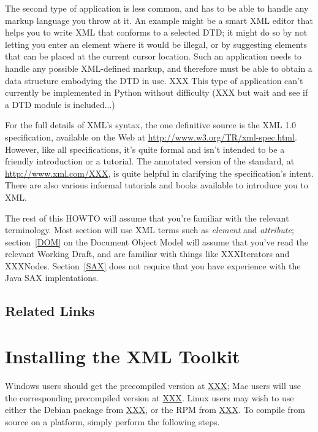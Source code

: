 \documentclass{howto}
\begin{document}
The second type of application is less common, and has to be able to
handle any markup language you throw at it.  An example might be a
smart XML editor that helps you to write XML that conforms to a
selected DTD; it might do so by not letting you enter an element where
it would be illegal, or by suggesting elements that can be placed at
the current cursor location.  Such an application needs to handle any
possible XML-defined markup, and therefore must be able to obtain a
data structure embodying the DTD in use.  XXX This type of application
can't currently be implemented in Python without difficulty (XXX but
wait and see if a DTD module is included...)

For the full details of XML's syntax, the one definitive source is the
XML 1.0 specification, available on the Web at
\url{http://www.w3.org/TR/xml-spec.html}.  However, like all
specifications, it's quite formal and isn't intended to be a friendly
introduction or a tutorial.  The annotated version of the standard, at
\url{http://www.xml.com/XXX}, is quite helpful in clarifying the
specification's intent.  There are also various informal tutorials and
books available to introduce you to XML.

The rest of this HOWTO will assume that you're familiar with the
relevant terminology.  Most section will use XML terms such as
\emph{element} and \emph{attribute}; section~\ref{DOM} on the Document
Object Model will assume that you've read the relevant Working Draft,
and are familiar with things like XXXIterators and XXXNodes.
Section~\ref{SAX} does not require that you have experience with the
Java SAX implentations.

\subsection{Related Links}


\section{Installing the XML Toolkit}

Windows users should get the precompiled version at \url{XXX}; Mac
users will use the corresponding precompiled version at \url{XXX}.
Linux users may wish to use either the Debian package from \url{XXX},
or the RPM from \url{XXX}.  To compile from source on a \UNIX{} platform,
simply perform the following steps.
\end{document}
